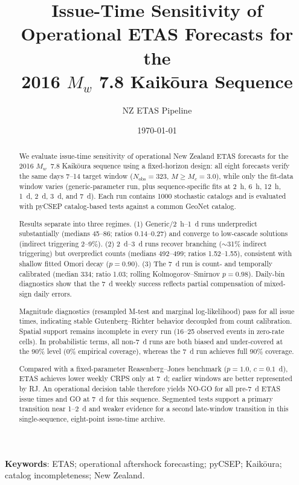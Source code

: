 \documentclass[12pt,letterpaper]{article}
\title{Issue-Time Sensitivity of Operational ETAS Forecasts for the\\
2016 $M_w$ 7.8 Kaik\={o}ura Sequence}
\author{NZ ETAS Pipeline}
\date{\today}
\newcommand{\Mc}{M_c}
\begin{document}
\maketitle
\doublespacing
\linenumbers

\begin{abstract}
We evaluate issue-time sensitivity of operational New Zealand ETAS forecasts
for the 2016 $M_w$~7.8 Kaik\={o}ura sequence using a fixed-horizon design:
all eight forecasts verify the same days 7--14 target window
($N_{\mathrm{obs}}=323$, $M\geq\Mc=3.0$), while only the fit-data window varies
(generic-parameter run, plus sequence-specific fits at 2~h, 6~h, 12~h, 1~d,
2~d, 3~d, and 7~d). Each run contains 1000 stochastic catalogs and is evaluated
with pyCSEP catalog-based tests against a common GeoNet catalog.

Results separate into three regimes. (1) Generic/2~h--1~d runs underpredict
substantially (medians 45--86; ratios 0.14--0.27) and converge to low-cascade
solutions (indirect triggering 2--9\%). (2) 2~d--3~d runs recover branching
($\sim$31\% indirect triggering) but overpredict counts (medians 492--499;
ratios 1.52--1.55), consistent with shallow fitted Omori decay ($p=0.90$).
(3) The 7~d run is count- and temporally calibrated (median 334; ratio 1.03;
rolling Kolmogorov--Smirnov $p=0.98$). Daily-bin diagnostics show that the
7~d weekly success reflects partial compensation of mixed-sign daily errors.

Magnitude diagnostics (resampled M-test and marginal log-likelihood) pass for
all issue times, indicating stable Gutenberg--Richter behavior decoupled from
count calibration. Spatial support remains incomplete in every run
(16--25 observed events in zero-rate cells). In probabilistic terms, all
non-7~d runs are both biased and under-covered at the 90\% level
(0\% empirical coverage), whereas the 7~d run achieves full 90\% coverage.

Compared with a fixed-parameter Reasenberg--Jones benchmark ($p=1.0$,
$c=0.1$~d), ETAS achieves lower weekly CRPS only at 7~d; earlier windows are
better represented by RJ. An operational decision table therefore yields NO-GO
for all pre-7~d ETAS issue times and GO at 7~d for this sequence. Segmented
tests support a primary transition near 1--2~d and weaker evidence for a second
late-window transition in this single-sequence, eight-point issue-time archive.
\end{abstract}

\textbf{Keywords}: ETAS; operational aftershock forecasting; pyCSEP;
Kaik\={o}ura; catalog incompleteness; New Zealand.
\end{document}
